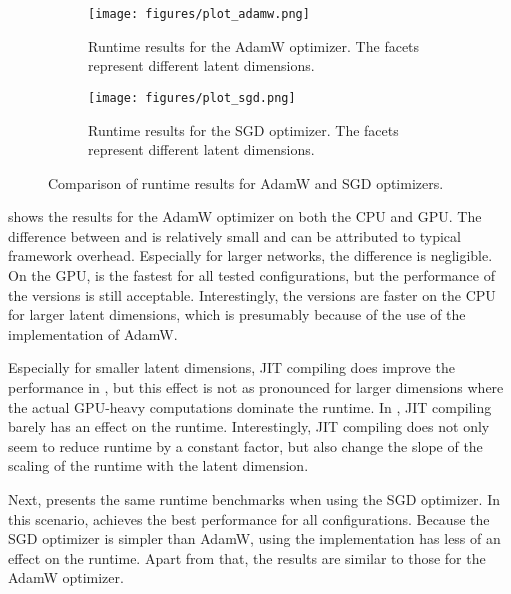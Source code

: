 \documentclass[article]{jss}
\theoremstyle{definition}
\begin{document}
\begin{figure}[H]
    \centering
    \begin{subfigure}{0.48\textwidth}
        \centering
        \texttt{[image: figures/plot\_adamw.png]}
        \caption{Runtime results for the AdamW optimizer. The facets represent different latent dimensions.}
        \label{fig:adamw-benchmark}
    \end{subfigure}
    \hfill
    \begin{subfigure}{0.48\textwidth}
        \centering
        \texttt{[image: figures/plot\_sgd.png]}
        \caption{Runtime results for the SGD optimizer. The facets represent different latent dimensions.}
        \label{fig:sgd-benchmark}
    \end{subfigure}
    \caption{Comparison of runtime results for AdamW and SGD optimizers.}
    \label{fig:optimizer-benchmark}
\end{figure}

 shows the results for the AdamW optimizer on both the CPU and GPU.
The difference between \torch{} and \mlrttorch{} is relatively small and can be attributed to typical framework overhead.
Especially for larger networks, the difference is negligible.
On the GPU, \pytorch{} is the fastest for all tested configurations, but the performance of the \rlang{} versions is still acceptable.
Interestingly, the \rlang{} versions are faster on the CPU for larger latent dimensions, which is presumably because of the use of the \libtorch{} implementation of AdamW.

Especially for smaller latent dimensions, JIT compiling does improve the performance in \rlang{}, but this effect is not as pronounced for larger dimensions where the actual GPU-heavy computations dominate the runtime.
In \pytorch{}, JIT compiling barely has an effect on the runtime.
Interestingly, JIT compiling does not only seem to reduce runtime by a constant factor, but also change the slope of the scaling of the runtime with the latent dimension.



Next,  presents the same runtime benchmarks when using the SGD optimizer.
In this scenario, \pytorch{} achieves the best performance for all configurations.
Because the SGD optimizer is simpler than AdamW, using the \libtorch{} implementation has less of an effect on the runtime.
Apart from that, the results are similar to those for the AdamW optimizer.
\end{document}
